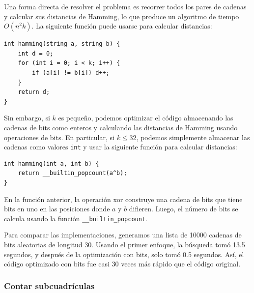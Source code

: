 Una forma directa de resolver el problema es
recorrer todos los pares de cadenas y calcular
sus distancias de Hamming,
lo que produce un algoritmo de tiempo $O(n^2 k)$.
La siguiente función puede usarse para
calcular distancias:
\begin{lstlisting}
int hamming(string a, string b) {
    int d = 0;
    for (int i = 0; i < k; i++) {
        if (a[i] != b[i]) d++;
    }
    return d;
}
\end{lstlisting}

Sin embargo, si $k$ es pequeño, podemos optimizar el código
almacenando las cadenas de bits como enteros y
calculando las distancias de Hamming usando operaciones de bits.
En particular, si $k \le 32$, podemos simplemente almacenar
las cadenas como valores \texttt{int} y usar la
siguiente función para calcular distancias:
\begin{lstlisting}
int hamming(int a, int b) {
    return __builtin_popcount(a^b);
}
\end{lstlisting}
En la función anterior, la operación xor construye
una cadena de bits que tiene bits en uno en las posiciones
donde $a$ y $b$ difieren.
Luego, el número de bits se calcula usando
la función \texttt{\_\_builtin\_popcount}.

Para comparar las implementaciones, generamos
una lista de 10000 cadenas de bits aleatorias de longitud 30.
Usando el primer enfoque, la búsqueda tomó
13.5 segundos, y después de la optimización con bits,
solo tomó 0.5 segundos.
Así, el código optimizado con bits fue casi
30 veces más rápido que el código original.

\subsubsection{Contar subcuadrículas}

